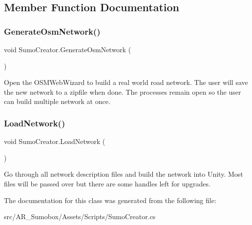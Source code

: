\subsection{Member Function Documentation}
\mbox{\label{class_sumo_creator_aa1e8e70d55f358f0a1af525056627b50}} 
\subsubsection{\texorpdfstring{GenerateOsmNetwork()}{GenerateOsmNetwork()}}
{\footnotesize\ttfamily void Sumo\+Creator.\+Generate\+Osm\+Network (\begin{DoxyParamCaption}{ }\end{DoxyParamCaption})}



Open the O\+S\+M\+Web\+Wizard to build a real world road network. The user will save the new network to a zipfile when done. The processes remain open so the user can build multiple network at once. 

\mbox{\label{class_sumo_creator_a6fd91bdf15a05d7fc2b27b9e56a07042}} 
\subsubsection{\texorpdfstring{LoadNetwork()}{LoadNetwork()}}
{\footnotesize\ttfamily void Sumo\+Creator.\+Load\+Network (\begin{DoxyParamCaption}{ }\end{DoxyParamCaption})}



Go through all network description files and build the network into Unity. Most files will be passed over but there are some handles left for upgrades. 



The documentation for this class was generated from the following file\+:\begin{DoxyCompactItemize}
\item 
src/\+A\+R\+\_\+\+Sumobox/\+Assets/\+Scripts/Sumo\+Creator.\+cs\end{DoxyCompactItemize}
